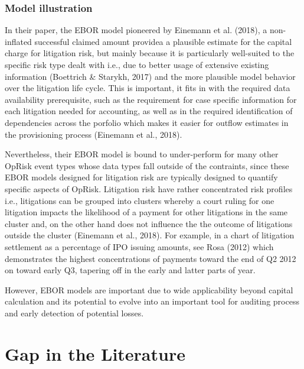 \documentclass{DissertateUSU}
\begin{document}
\subsubsection{Model illustration}
\label{sssec:Model illustration}

In their paper, the EBOR model pioneered by Einemann et al. (2018), a
non-inflated successful claimed amount providea a plausible estimate for
the capital charge for litigation risk, but mainly because it is
particularly well-suited to the specific risk type dealt with i.e., due
to better usage of extensive existing information (Boettrich \& Starykh,
2017) and the more plausible model behavior over the litigation life
cycle. This is important, it fits in with the required data availability
prerequisite, such as the requirement for case specific information for
each litigation needed for accounting, as well as in the required
identification of dependencies across the porfolio which makes it easier
for outflow estimates in the provisioning process (Einemann et al.,
2018).\medskip 

Nevertheless, their EBOR model is bound to under-perform for many other
OpRisk event types whose data types fall outside of the contraints,
since these EBOR models designed for litigation risk are typically
designed to quantify specific aspects of OpRisk. Litigation risk have
rather concentrated risk profiles i.e., litigations can be grouped into
clusters whereby a court ruling for one litigation impacts the
likelihood of a payment for other litigations in the same cluster and,
on the other hand does not influence the the outcome of litigations
outside the cluster (Einemann et al., 2018). For example, in a chart of
litigation settlement as a percentage of IPO issuing amounts, see Rosa
(2012) which demonstrates the highest concentrations of payments toward
the end of Q2 2012 on toward early Q3, tapering off in the early and
latter parts of year.\medskip

However, EBOR models are important due to wide applicability beyond
capital calculation and its potential to evolve into an important tool
for auditing process and early detection of potential losses.

\section{Gap in the Literature}
\label{sec:Gap in the Literature}
\end{document}

